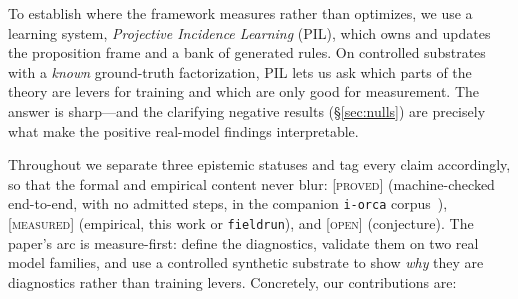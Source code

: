 \documentclass[sigconf,nonacm]{acmart}
\theoremstyle{definition}
\newcommand{\proved}{\textsc{[proved]}}
\newcommand{\measured}{\textsc{[measured]}}
\newcommand{\open}{\textsc{[open]}}
\begin{document}
To establish where the framework measures rather than optimizes, we use a learning
system, \emph{Projective Incidence Learning} (PIL), which owns and updates the
proposition frame and a bank of generated rules. On controlled substrates with a
\emph{known} ground-truth factorization, PIL lets us ask which parts of the theory
are levers for training and which are only good for measurement. The answer is
sharp---and the clarifying negative results (\S\ref{sec:nulls}) are precisely what
make the positive real-model findings interpretable.

Throughout we separate three epistemic statuses and tag every claim accordingly, so
that the formal and empirical content never blur: \proved{} (machine-checked
end-to-end, with no admitted steps, in the companion \texttt{i-orca}
corpus~\cite{iorca}), \measured{}
(empirical, this work or \texttt{fieldrun}), and \open{} (conjecture). The paper's
arc is measure-first: define the diagnostics, validate them on two real model
families, and use a controlled synthetic substrate to show \emph{why} they are
diagnostics rather than training levers. Concretely, our contributions are:
\end{document}
